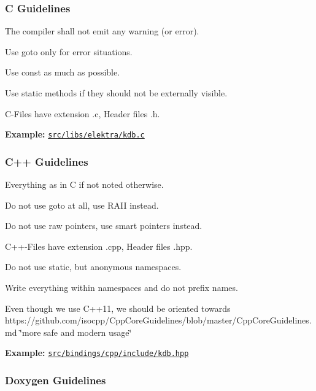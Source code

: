 \subsubsection*{C Guidelines}


\begin{DoxyItemize}
\item The compiler shall not emit any warning (or error).
\item Use goto only for error situations.
\item Use {\ttfamily const} as much as possible.
\item Use {\ttfamily static} methods if they should not be externally visible.
\item C-\/\+Files have extension {\ttfamily .c}, Header files {\ttfamily .h}.
\end{DoxyItemize}

{\bfseries Example\+:} \href{/home/markus/Projekte/Elektra/current/src/libs/elektra/kdb.c}{\tt src/libs/elektra/kdb.\+c}

\subsubsection*{C++ Guidelines}


\begin{DoxyItemize}
\item Everything as in C if not noted otherwise.
\item Do not use goto at all, use R\+A\+I\+I instead.
\item Do not use raw pointers, use smart pointers instead.
\item C++-\/\+Files have extension {\ttfamily .cpp}, Header files {\ttfamily .hpp}.
\item Do not use {\ttfamily static}, but anonymous namespaces.
\item Write everything within namespaces and do not prefix names.
\item Even though we use C++11, we should be oriented towards https\+://github.com/isocpp/\+Cpp\+Core\+Guidelines/blob/master/\+Cpp\+Core\+Guidelines.\+md \char`\"{}more safe and modern usage\char`\"{}
\end{DoxyItemize}

{\bfseries Example\+:} \href{http://libelektra.org/tree/master/src/bindings/cpp/include/kdb.hpp}{\tt src/bindings/cpp/include/kdb.\+hpp}

\subsubsection*{Doxygen Guidelines}

